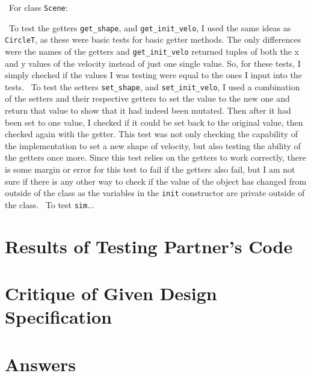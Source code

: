 \documentclass[12pt]{article}
\begin{document}
~\newline\noindent For class \verb|Scene|:

~\newline\noindent To test the getters \verb|get_shape|, and \verb|get_init_velo|, I used the same ideas as \verb|CircleT|, as these were basic tests for basic getter methods. The only differences were the names of the getters and \verb|get_init_velo| returned tuples of both the x and y values of the velocity instead of just one single value. So, for these tests, I simply checked if the values I was testing were equal to the ones I input into the tests. 
~\newline\noindent To test the setters \verb|set_shape|, and \verb|set_init_velo|, I used a combination of the setters and their respective getters to set the value to the new one and return that value to show that it had indeed been mutated. Then after it had been set to one value, I checked if it could be set back to the original value, then checked again with the getter. This test was not only checking the capability of the implementation to set a new shape of velocity, but also testing the ability of the getters once more. Since this test relies on the getters to work correctly, there is some margin or error for this test to fail if the getters also fail, but I am not sure if there is any other way to check if the value of the object has changed from outside of the class as the variables in the \verb|init| constructor are private outside of the class. 
~\newline\noindent To test \verb|sim|...



\section{Results of Testing Partner's Code}


\section{Critique of Given Design Specification}


\section{Answers}
\end{document}
